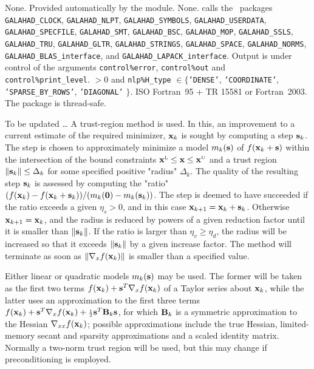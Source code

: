 \documentclass{galahad}
\newcommand{\packagename}{EXPO}
\newcommand{\sL}{\s{L}}
\newcommand{\sU}{\s{U}}
\begin{document}

\galgeneral

\galcommon None.
\galworkspace Provided automatically by the module.
\galroutines None.
\galmodules {\tt \packagename\_solve} calls the \galahad\ packages
{\tt GALAHAD\_CLOCK},
{\tt GALAHAD\_NLPT},
{\tt GALAHAD\_SY\-M\-BOLS}, \sloppy
{\tt GALAHAD\_USERDATA},
{\tt GALAHAD\_SPECFILE},
{\tt GALAHAD\_SMT},
{\tt GALAHAD\_BSC},
{\tt GALAHAD\_MOP},
{\tt GALAHAD\_SSLS},
{\tt GALAHAD\_TRU},
{\tt GALAHAD\_GLTR},
{\tt GALAHAD\_STRINGS},
{\tt GALAHAD\_SPACE},
{\tt GALAHAD\_\-NORMS},
{\tt GALAHAD\_BLAS\_interface},
and
{\tt GALAHAD\_LAPACK\_interface}.
\galio Output is under control of the arguments
 {\tt control\%error}, {\tt control\%out} and {\tt control\%print\_level}.
 $> 0$ and
{\tt nlp\%H\_type} $\in \{${\tt 'DENSE'},
 {\tt 'COORDINATE'}, {\tt 'SPARSE\_BY\_ROWS'}, {\tt 'DIAGONAL'} $\}$.
\galportability ISO Fortran~95 + TR 15581 or Fortran~2003.
The package is thread-safe.


\galmethod
To be updated \ldots
A trust-region method is used. In this, an improvement to a current
estimate of the required minimizer, ${\mathbf{x}}_k$ is sought by computing a
step ${\mathbf{s}}_k$. The step is chosen to approximately minimize a model $m_k({\mathbf{s}})$
of $f({\mathbf{x}}_k + {\mathbf{s}})$ within the intersection of the bound constraints
$\bmx\sL \leq \bmx \leq \bmx\sU$ and a trust region $\|{\mathbf{s}}_k\| \leq \Delta_k$
for some specified positive "radius" $\Delta_k$. The quality of the
resulting step ${\mathbf{s}}_k$ is assessed by computing the "ratio"
$(f({\mathbf{x}}_k) - f({\mathbf{x}}_k + {\mathbf{s}}_k))/ (m_k({\mathbf{0}}) - m_k({\mathbf{s}}_k))$.
The step is deemed to have succeeded if the ratio exceeds a given $\eta_s > 0$,
and in this case ${\mathbf{x}}_{k+1} = {\mathbf{x}}_k + {\mathbf{s}}_k$. Otherwise
${\mathbf{x}}_{k+1} = {\mathbf{x}}_k$, and the radius is reduced by powers of a given
reduction factor until it is smaller than $\|{\mathbf{s}}_k\|$. If the ratio
is larger than  $\eta_v \geq \eta_d$, the radius will be increased so that
it exceeds $\|{\mathbf{s}}_k\|$ by a given increase factor. The method will terminate
as soon as $\|\nabla_x f({\mathbf{x}}_k)\|$ is smaller than a specified value.

Either linear or quadratic models $m_k({\mathbf{s}})$ may be used. The former will be
taken as the first two terms $f({\mathbf{x}}_k) + {\mathbf{s}}^T \nabla_x f({\mathbf{x}}_k)$
of a Taylor series about ${\mathbf{x}}_k$, while the latter uses an
approximation to the first three terms
$f({\mathbf{x}}_k) + {\mathbf{s}}^T \nabla_x f({\mathbf{x}}_k) + {\scriptstyle \frac{1}{2}}
{\mathbf{s}}^T {\mathbf{B}}_k {\mathbf{s}}$,
for which ${\mathbf{B}}_k$ is a symmetric approximation to the Hessian
$\nabla_{xx} f({\mathbf{x}}_k)$; possible approximations include the true Hessian,
limited-memory secant and sparsity approximations and a scaled identity matrix.
Normally a two-norm trust region will be used, but this may change
if preconditioning is employed.
\end{document}
